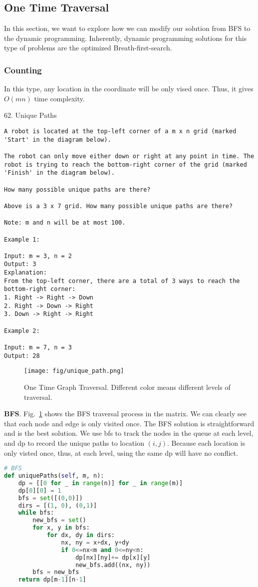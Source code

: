 \documentclass[../main.tex]{subfiles}
\begin{document}
\subsection{One Time Traversal}
\label{sec_coordinate_counting}
In this section, we want to explore how we can modify our solution from BFS to the dynamic programming. Inherently, dynamic programming solutions for this type of problems are the optimized Breath-first-search. 

\subsubsection{Counting} In this type, any location in the coordinate will be only vised once. Thus, it gives $O(mn)$ time complexity. 

62. Unique Paths
\begin{lstlisting}
A robot is located at the top-left corner of a m x n grid (marked 'Start' in the diagram below).

The robot can only move either down or right at any point in time. The robot is trying to reach the bottom-right corner of the grid (marked 'Finish' in the diagram below).

How many possible unique paths are there?

Above is a 3 x 7 grid. How many possible unique paths are there?

Note: m and n will be at most 100.

Example 1:

Input: m = 3, n = 2
Output: 3
Explanation:
From the top-left corner, there are a total of 3 ways to reach the bottom-right corner:
1. Right -> Right -> Down
2. Right -> Down -> Right
3. Down -> Right -> Right

Example 2:

Input: m = 7, n = 3
Output: 28
\end{lstlisting}
\begin{figure}[h]
    \centering
    \texttt{[image: fig/unique\_path.png]}
    \caption{One Time Graph Traversal. Different color means different levels of traversal.}
    \label{fig:unique_path}
\end{figure}
\textbf{BFS}. Fig.~\ref{fig:unique_path} shows the BFS traversal process in the matrix. We can clearly see that each node and edge is only visited once. The BFS solution is straightforward and is the best solution. We use bfs to track the nodes in the queue at each level, and dp to record the unique paths to location $(i,j)$. Because each location is only visted once, thus, at each level, using the same dp will have no conflict.  
\begin{lstlisting}[language = Python]
# BFS
def uniquePaths(self, m, n):
    dp = [[0 for _ in range(n)] for _ in range(m)]
    dp[0][0] = 1
    bfs = set([(0,0)])
    dirs = [(1, 0), (0,1)]
    while bfs:
        new_bfs = set()
        for x, y in bfs:
            for dx, dy in dirs:
                nx, ny = x+dx, y+dy
                if 0<=nx<m and 0<=ny<n:
                    dp[nx][ny]+= dp[x][y]
                    new_bfs.add((nx, ny))
        bfs = new_bfs
    return dp[m-1][n-1]
\end{lstlisting}
\end{document}
